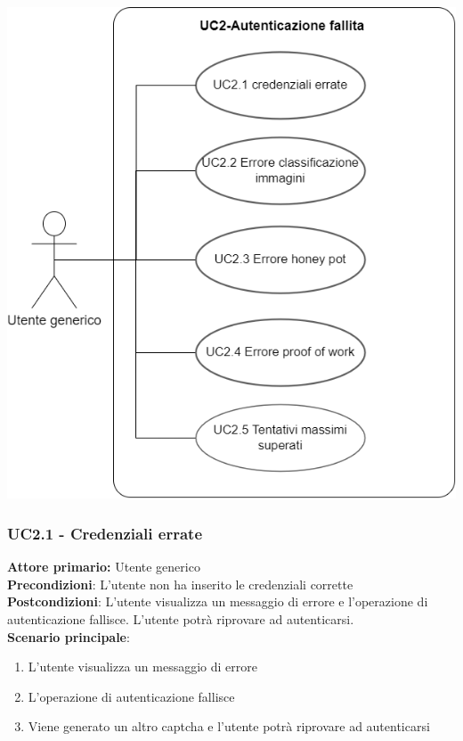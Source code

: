 \begin{center}
	\includegraphics[scale = 0.9]{img/Autenticazione_fallita.png}\\
\end{center}

\subsubsection{UC2.1 - Credenziali errate}
\textbf{Attore primario:} Utente generico\\
\textbf{Precondizioni}: L’utente non ha inserito le credenziali corrette\\
\textbf{Postcondizioni}:  L’utente visualizza un messaggio di errore e l’operazione di autenticazione fallisce. L’utente potrà riprovare  ad autenticarsi.\\

\textbf{Scenario principale}:
\begin{enumerate}
	\item L’utente visualizza un messaggio di errore
	\item L’operazione di autenticazione fallisce
	\item Viene generato un altro captcha e l’utente potrà riprovare ad autenticarsi
\end{enumerate}

